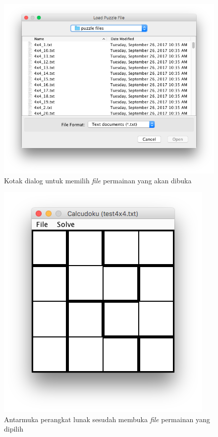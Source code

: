 \begin{enumerate}
\begin{figure}
\centering
\captionsetup{justification=centering}
\includegraphics[scale=0.5]{Gambar/ImplementasiPengujian/FileChooser.png}
\caption[Kotak dialog untuk memilih \textit{file} permainan yang akan dibuka]{Kotak dialog untuk memilih \textit{file} permainan yang akan dibuka}
\label{fig:antarmukapl2}
\end{figure}

\begin{figure}
\centering
\captionsetup{justification=centering}
\includegraphics[scale=0.5]{Gambar/ImplementasiPengujian/Calcudoku2.png}
\caption[Antarmuka perangkat lunak sesudah membuka \textit{file} permainan yang dipilih]{Antarmuka perangkat lunak sesudah membuka \textit{file} permainan yang dipilih}
\label{fig:antarmukapl3}
\end{figure}


\end{enumerate}

